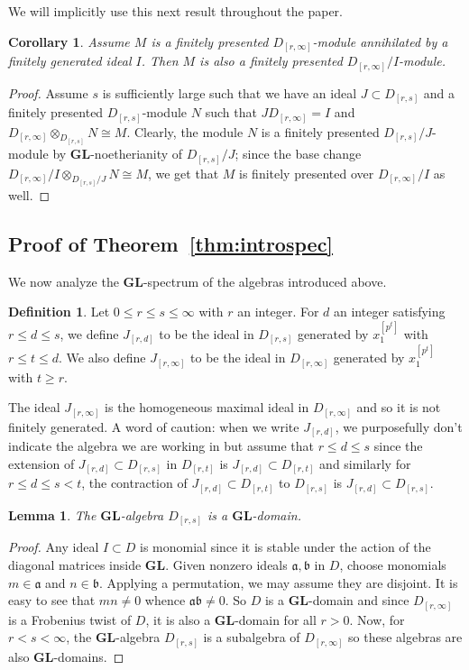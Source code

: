 \documentclass[12pt]{amsart}
\newcommand{\fa}{\mathfrak{a}}
\newcommand{\fb}{\mathfrak{b}}
\newcommand{\Drs}{D_{[r,s]}}
\newcommand{\Jrd}{J_{[r,d]}}
\newcommand{\Jrinfty}{J_{[r,\infty]}}
\newcommand{\Drinfty}{D_{[r,\infty]}}
\newcommand{\GL}{\mathbf{GL}}
\numberwithin{equation}{section}
\newtheorem{lemma}[equation]{Lemma}
\newtheorem{corollary}[equation]{Corollary}
\theoremstyle{definition}
\newtheorem{defn}[equation]{Definition}
\theoremstyle{plain}
\begin{document}
We will implicitly use this next result throughout the paper.

\begin{corollary}
    Assume $M$ is a finitely presented $\Drinfty$-module annihilated by a finitely generated ideal $I$. Then $M$ is also a finitely presented $\Drinfty/I$-module.
\end{corollary}
\begin{proof}
    Assume $s$ is sufficiently large such that we have an ideal $J \subset \Drs$ and a finitely presented $\Drs$-module $N$ such that $J \Drinfty = I$ and $\Drinfty \otimes_{\Drs} N \cong M$. Clearly, the module $N$ is a finitely presented $\Drs/J$-module by $\GL$-noetherianity of $\Drs/J$; since the base change $\Drinfty/I \otimes_{\Drs/J} N \cong M$, we get that $M$ is finitely presented over $\Drinfty/I$ as well.
\end{proof}


\subsection{Proof of Theorem~\ref{thm:introspec}}\label{ss:glspec}
We now analyze the $\GL$-spectrum of the algebras introduced above. 

\begin{defn}
Let $0 \leq r \leq s \leq \infty$ with $r$ an integer. For $d$ an integer satisfying $ r \leq d  \leq s $, we define $\Jrd$ to be the ideal in $\Drs$ generated by $x_1^{[p^t]}$ with $r \leq t \leq d$. We also define $\Jrinfty$ to be the ideal in $\Drinfty$ generated by $x_1^{[p^t]}$ with $t \geq r$. 
\end{defn}


The ideal $\Jrinfty$ is the homogeneous maximal ideal in $\Drinfty$ and so it is not finitely generated. A word of caution: when we write $\Jrd$, we purposefully don't indicate the algebra we are working in but assume that $r \leq d \leq s$ since the extension of $\Jrd \subset \Drs$ in $D_{[r, t]}$ is $\Jrd \subset D_{[r, t]}$ and similarly for $r \leq d \leq s < t$, the contraction of $\Jrd \subset D_{[r, t]}$ to $\Drs$ is $\Jrd \subset \Drs$.



\begin{lemma}
    The $\GL$-algebra $\Drs$ is a $\GL$-domain. 
\end{lemma}
\begin{proof}
    Any ideal $I \subset D$ is monomial since it is stable under the action of the diagonal matrices inside $\GL$. Given nonzero ideals $\fa, \fb$ in $D$, choose monomials $m \in \fa$ and $n \in \fb$. Applying a permutation, we may assume they are disjoint. It is easy to see that $mn \ne 0$ whence $\fa \fb \ne 0$. So $D$ is a $\GL$-domain and since $\Drinfty$ is a Frobenius twist of $D$, it is also a $\GL$-domain for all $r > 0$. Now, for $r < s < \infty$, the $\GL$-algebra $\Drs$ is a subalgebra of $\Drinfty$ so these algebras are also $\GL$-domains.
\end{proof}
\end{document}
